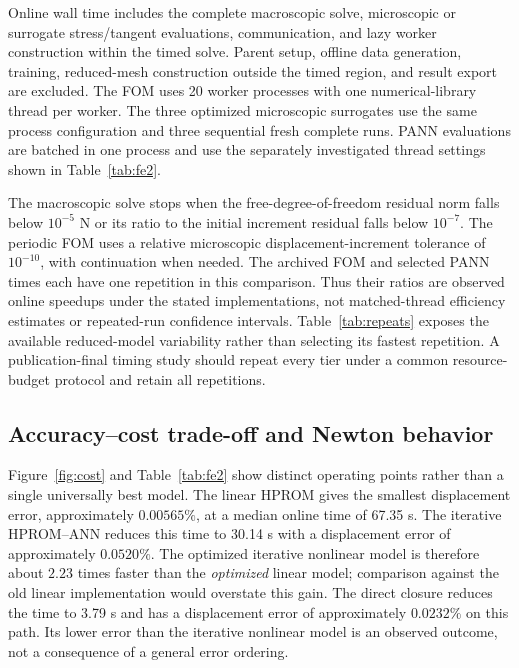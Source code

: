 Online wall time includes the complete macroscopic solve, microscopic or surrogate stress/tangent evaluations, communication, and lazy worker construction within the timed solve. Parent setup, offline data generation, training, reduced-mesh construction outside the timed region, and result export are excluded. The FOM uses 20 worker processes with one numerical-library thread per worker. The three optimized microscopic surrogates use the same process configuration and three sequential fresh complete runs. PANN evaluations are batched in one process and use the separately investigated thread settings shown in Table~\ref{tab:fe2}.

The macroscopic solve stops when the free-degree-of-freedom residual norm falls below $10^{-5}$ N or its ratio to the initial increment residual falls below $10^{-7}$. The periodic FOM uses a relative microscopic displacement-increment tolerance of $10^{-10}$, with continuation when needed. The archived FOM and selected PANN times each have one repetition in this comparison. Thus their ratios are observed online speedups under the stated implementations, not matched-thread efficiency estimates or repeated-run confidence intervals. Table~\ref{tab:repeats} exposes the available reduced-model variability rather than selecting its fastest repetition. A publication-final timing study should repeat every tier under a common resource-budget protocol and retain all repetitions.

\begin{table}[htbp]
 \centering\footnotesize
 \caption{Complete coupon simulations: final-field errors against the nested FOM and archived online wall times.}
 \label{tab:fe2}
 
\end{table}
\begin{table}[htbp]
 \centering\small
 \caption{Sequential optimized-run repetitions used for median HPROM timings.}
 \label{tab:repeats}
 
\end{table}

\subsection{Accuracy--cost trade-off and Newton behavior}
Figure~\ref{fig:cost} and Table~\ref{tab:fe2} show distinct operating points rather than a single universally best model. The linear HPROM gives the smallest displacement error, approximately $0.00565\%$, at a median online time of 67.35 s. The iterative HPROM--ANN reduces this time to 30.14 s with a displacement error of approximately $0.0520\%$. The optimized iterative nonlinear model is therefore about $2.23$ times faster than the \emph{optimized} linear model; comparison against the old linear implementation would overstate this gain. The direct closure reduces the time to 3.79 s and has a displacement error of approximately $0.0232\%$ on this path. Its lower error than the iterative nonlinear model is an observed outcome, not a consequence of a general error ordering.


